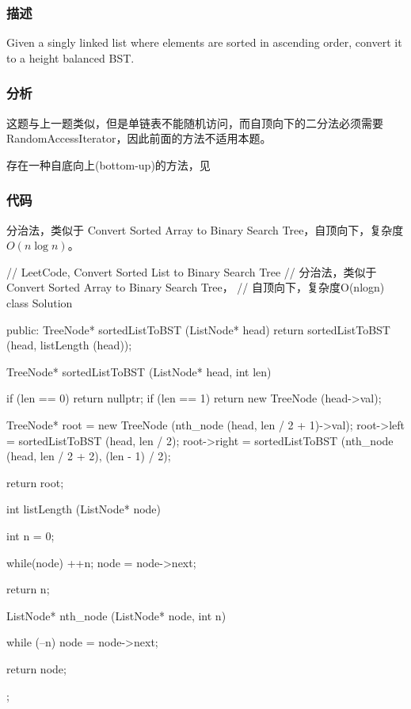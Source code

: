 \subsubsection{描述}
Given a singly linked list where elements are sorted in ascending order, convert it to a height balanced BST.


\subsubsection{分析}
这题与上一题类似，但是单链表不能随机访问，而自顶向下的二分法必须需要RandomAccessIterator，因此前面的方法不适用本题。

存在一种自底向上(bottom-up)的方法，见

\subsubsection{代码}

分治法，类似于 Convert Sorted Array to Binary Search Tree，自顶向下，复杂度$O(n\log n)$。
\begin{Code}
// LeetCode, Convert Sorted List to Binary Search Tree
// 分治法，类似于 Convert Sorted Array to Binary Search Tree，
// 自顶向下，复杂度O(nlogn)
class Solution {
public:
    TreeNode* sortedListToBST (ListNode* head) {
        return sortedListToBST (head, listLength (head));
    }

    TreeNode* sortedListToBST (ListNode* head, int len) {
        if (len == 0) return nullptr;
        if (len == 1) return new TreeNode (head->val);

        TreeNode* root = new TreeNode (nth_node (head, len / 2 + 1)->val);
        root->left = sortedListToBST (head, len / 2);
        root->right = sortedListToBST (nth_node (head, len / 2 + 2), 
                (len - 1) / 2);

        return root;
    }

    int listLength (ListNode* node) {
        int n = 0;

        while(node) {
            ++n;
            node = node->next;
        }

        return n;
    }

    ListNode* nth_node (ListNode* node, int n) {
        while (--n)
            node = node->next;

        return node;
    }
};
\end{Code}

